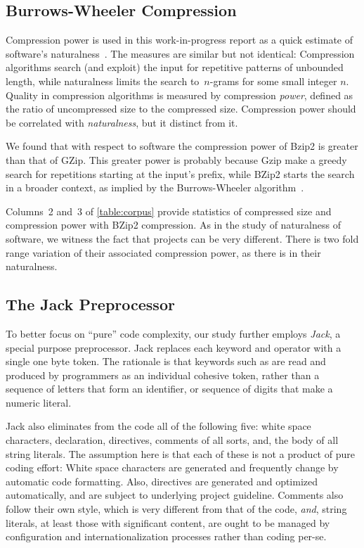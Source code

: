 \subsection{Burrows-Wheeler Compression}
Compression power is used in this work-in-progress report as a quick estimate
of software's naturalness~\cite{Hindle:Bar:Su:Gabel:Devanbu:2012}.  The
measures are similar but not identical: Compression algorithms search
(and exploit) the input for repetitive patterns of unbounded length, while
naturalness limits the search to~$n$-grams for some small integer $n$.  Quality
in compression algorithms is measured by compression \emph{power}, defined as
the ratio of uncompressed size to the compressed size. Compression power should
be correlated with \emph{naturalness}, but it distinct from it.

We found that with respect to \Java software the compression power of Bzip2 is
greater than that of GZip. This greater power is probably because Gzip make a
greedy search for repetitions starting at the input's prefix, while BZip2
starts the search in a broader context, as implied by the Burrows-Wheeler
algorithm~\cite{Burrows:Wheeler:94}.

Columns~2 and~3 of \cref{table:corpus} provide statistics of compressed size and
compression power with BZip2 compression. As in the
study of naturalness of software, we witness the fact that projects can be very 
different. There is two fold range variation of their associated compression
power, as there is in their naturalness.

\subsection{The Jack Preprocessor}

To better focus on ``pure''  code complexity, our study further employs
\emph{Jack}, a special purpose preprocessor. Jack replaces each keyword and
operator with a single one byte token. The rationale is that keywords such as
 are read and produced by programmers as an individual cohesive
token, rather than a sequence of letters that form an identifier, or sequence
of digits that make a numeric literal.

Jack also eliminates from the \Java code all of the following five: white space
characters,  declaration,  directives, comments of all
sorts, and, the body of all string literals.  The assumption here is that each
of these is not a product of pure coding effort: White space characters are
generated and frequently change by automatic code formatting. Also, 
directives are generated and optimized automatically, and are subject to
underlying project guideline. Comments also follow their own style, which is
very different from that of the code, \emph{and}, string literals, at least
those with significant content, are ought to be managed by configuration and
internationalization processes rather than coding per-se. 

